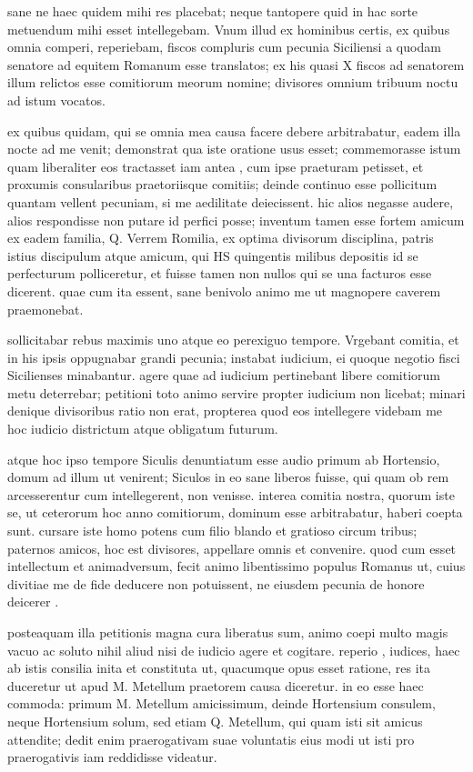  sane ne haec quidem mihi res placebat; neque tantopere quid in hac sorte metuendum mihi esset intellegebam. Vnum illud ex hominibus certis, ex quibus omnia comperi, reperiebam, fiscos compluris cum pecunia Siciliensi a quodam senatore ad equitem Romanum esse translatos; ex his quasi X fiscos ad senatorem illum relictos esse comitiorum meorum nomine; divisores omnium tribuum noctu ad istum vocatos.

 ex quibus quidam, qui se omnia mea causa facere debere arbitrabatur, eadem illa nocte ad me venit; demonstrat qua iste oratione usus esset; commemorasse istum quam liberaliter eos tractasset iam antea , cum ipse praeturam petisset, et proxumis consularibus praetoriisque comitiis; deinde continuo esse pollicitum quantam vellent pecuniam, si me aedilitate deiecissent. hic alios negasse audere, alios respondisse non putare id perfici posse; inventum tamen esse fortem amicum ex eadem familia, Q. Verrem Romilia, ex optima divisorum disciplina, patris istius discipulum atque amicum, qui HS quingentis milibus depositis id se perfecturum polliceretur, et fuisse tamen non nullos qui se una facturos esse dicerent. quae cum ita essent, sane benivolo animo me ut magnopere caverem praemonebat.

 sollicitabar rebus maximis uno atque eo perexiguo tempore. Vrgebant comitia, et in his ipsis oppugnabar grandi pecunia; instabat iudicium, ei quoque negotio fisci Sicilienses minabantur. agere quae ad iudicium pertinebant libere comitiorum metu deterrebar; petitioni toto animo servire propter iudicium non licebat; minari denique divisoribus ratio non erat, propterea quod eos intellegere videbam me hoc iudicio districtum atque obligatum futurum.

 atque hoc ipso tempore Siculis denuntiatum esse audio primum ab Hortensio, domum ad illum ut venirent; Siculos in eo sane liberos fuisse, qui quam ob rem arcesserentur cum intellegerent, non venisse. interea comitia nostra, quorum iste se, ut ceterorum hoc anno comitiorum, dominum esse arbitrabatur, haberi coepta sunt. cursare iste homo potens cum filio blando et gratioso circum tribus; paternos amicos, hoc est divisores, appellare omnis et convenire. quod cum esset intellectum et animadversum, fecit animo libentissimo populus Romanus ut, cuius divitiae me de fide deducere non potuissent, ne eiusdem pecunia de honore deicerer .

 posteaquam illa petitionis magna cura liberatus sum, animo coepi multo magis vacuo ac soluto nihil aliud nisi de iudicio agere et cogitare. reperio , iudices, haec ab istis consilia inita et constituta ut, quacumque opus esset ratione, res ita duceretur ut apud M. Metellum praetorem causa diceretur. in eo esse haec commoda: primum M. Metellum amicissimum, deinde Hortensium consulem, neque Hortensium solum, sed etiam Q. Metellum, qui quam isti sit amicus attendite; dedit enim praerogativam suae voluntatis eius modi ut isti pro praerogativis iam reddidisse videatur.

